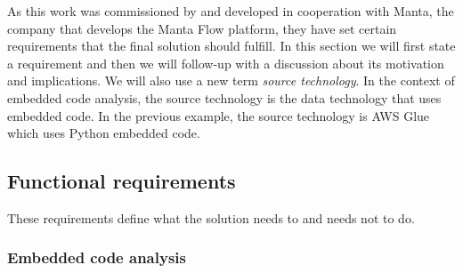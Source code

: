 As this work was commissioned by and developed in cooperation with Manta, the company that develops the Manta Flow platform, they have set certain requirements that the final solution should fulfill. In this section we will first state a requirement and then we will follow-up with a discussion about its motivation and implications. We will also use a new term \textit{source technology}. In the context of embedded code analysis, the source technology is the data technology that uses embedded code. In the previous example, the source technology is AWS Glue which uses Python embedded code.

\subsection{Functional requirements}

These requirements define what the solution needs to and needs not to do.

\subsubsection{Embedded code analysis}

